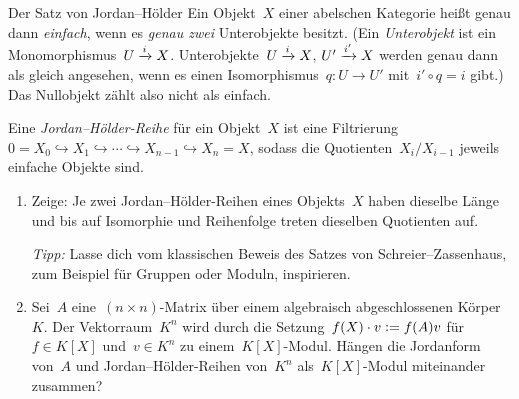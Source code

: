 \documentclass{uebblatt}
\begin{document}
\begin{aufgabe}{Der Satz von Jordan--Hölder}
Ein Objekt~$X$ einer abelschen Kategorie heißt genau dann \emph{einfach}, wenn
es \emph{genau zwei} Unterobjekte besitzt. (Ein \emph{Unterobjekt} ist ein
Monomorphismus~$U \xrightarrow{i} X$. Unterobjekte~$U \xrightarrow{i} X$, $U' \xrightarrow{i'} X$
werden genau dann als gleich angesehen, wenn es einen Isomorphismus~$q : U \to
U'$ mit~$i' \circ q = i$ gibt.) Das Nullobjekt zählt also nicht als einfach.

Eine \emph{Jordan--Hölder-Reihe} für ein Objekt~$X$ ist eine Filtrierung
$0 = X_0 \hookrightarrow X_1 \hookrightarrow \cdots \hookrightarrow X_{n-1}
\hookrightarrow X_n = X$, sodass die Quotienten~$X_i/X_{i-1}$ jeweils einfache
Objekte sind.
\begin{enumerate}
\item Zeige: Je zwei Jordan--Hölder-Reihen eines Objekts~$X$ haben dieselbe
Länge und bis auf Isomorphie und Reihenfolge treten dieselben Quotienten auf.

{\tiny\emph{Tipp:} Lasse dich vom klassischen Beweis des Satzes von
Schreier--Zassenhaus, zum Beispiel für Gruppen oder Moduln, inspirieren.\par}
\item Sei~$A$ eine~$(n \times n)$-Matrix über einem algebraisch abgeschlossenen
Körper~$K$. Der Vektorraum~$K^n$ wird durch die Setzung~$f(X) \cdot v \vcentcolon= f(A)v$
für~$f \in K[X]$ und~$v \in K^n$ zu einem~$K[X]$-Modul. Hängen die
Jordanform von~$A$ und Jordan--Hölder-Reihen von~$K^n$ als~$K[X]$-Modul
miteinander zusammen?
\end{enumerate}
\end{aufgabe}
\end{document}

